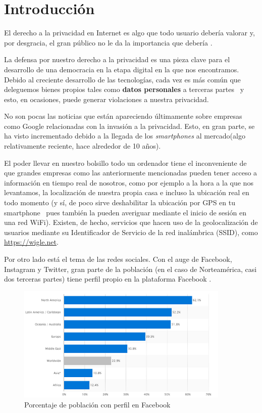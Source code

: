 \chapter{Introducción} 
\label{chap:intro}

\vspace{-0.2cm} 

El derecho a la privacidad en Internet es algo que todo usuario
debería valorar y, por desgracia, el gran público no le da
  la importancia que debería \cite{book:PrivacyBigDataPublicGood}.

La defensa por nuestro derecho a la privacidad es una pieza clave para el desarrollo de una democracia en la etapa digital en la que nos encontramos. Debido al creciente desarrollo de las tecnologías, cada vez es más común que deleguemos bienes propios tales como \textbf{datos personales} a terceras partes~\cite{paper:OECD} y esto, en ocasiones, puede generar violaciones a nuestra privacidad.

No son pocas las noticias que están apareciendo últimamente sobre
empresas como Google relacionadas con la invasión a la
privacidad. Esto, en gran parte, se ha visto incrementado debido a la
llegada de los \textit{smartphones} al mercado(algo relativamente
reciente, hace alrededor de 10 años). 

El poder llevar en nuestro bolsillo todo un ordenador tiene el inconveniente de que grandes empresas como las anteriormente mencionadas pueden tener acceso a
información en tiempo real de nosotros, como por ejemplo a la hora a
la que nos levantamos, la localización de nuestra propia casa e
incluso la ubicación real en todo momento (y sí, de poco sirve
deshabilitar la ubicación por GPS en tu smartphone~\cite{article:GPSTracking} pues también la
pueden averiguar mediante el inicio de sesión en una red WiFi). Existen, de hecho, servicios que hacen uso de la geolocalización de usuarios mediante su Identificador de Servicio de la red inalámbrica (SSID), como \url{https://wigle.net}.

Por otro lado está el tema de las redes sociales. Con el auge de
Facebook, Instagram y Twitter, gran parte de la población (en el caso
de Norteamérica, casi dos terceras partes) tiene perfil propio en la
plataforma Facebook .

\begin{figure}[h]
	\centerline{
		\mbox{\includegraphics[width=4.00in]{images/sn.png}}
	}
	\caption{Porcentaje de población con perfil en Facebook~\cite{article:FacebookStats} }
	\label{fig:FBStats}
\end{figure}


